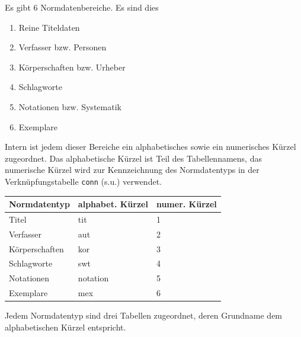 \documentclass[11pt, twoside, a4paper, BCOR8mm, DIV12, bibtotoc,idxtotoc]{scrbook}
\begin{document}
Es gibt 6 Normdatenbereiche. Es sind dies
\begin{enumerate}
\item Reine Titeldaten
\item Verfasser bzw. Personen
\item Körperschaften bzw. Urheber
\item Schlagworte
\item Notationen bzw. Systematik
\item Exemplare
\end{enumerate}

Intern ist jedem dieser Bereiche ein alphabetisches sowie ein
numerisches Kürzel zugeordnet. Das alphabetische Kürzel ist Teil des
Tabellen\-namens, das numerische Kürzel wird zur Kennzeichnung des
Normdatentyps in der Verknüpfungs\-tabelle \texttt{conn} (s.u.)
verwendet.

\begin{tabular}[c]{lll}
  Normdatentyp   & alphabet. Kürzel & numer. Kürzel\\
  \hline
  Titel          & tit              & 1\\
  Verfasser      & aut              & 2\\
  Körperschaften & kor              & 3\\
  Schlagworte    & swt              & 4\\
  Notationen     & notation         & 5\\
  Exemplare      & mex              & 6\\
\end{tabular}

Jedem Normdatentyp sind drei Tabellen zugeordnet, deren Grundname
dem alphabetischen Kürzel entspricht.
\end{document}
